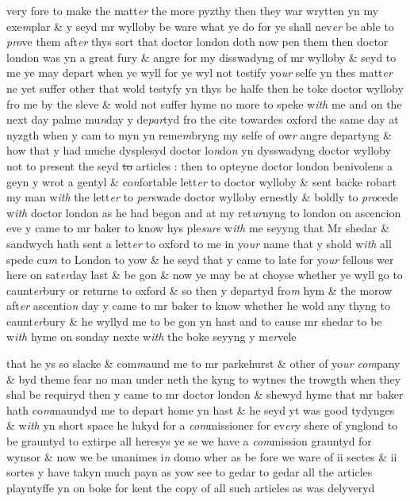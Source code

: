 \documentclass[12pt, a4paper]{book}
\begin{document}
 		
		\ifthenelse{\isodd{\thepage}}
		{\reversemarginpar}
		{\normalmarginpar}
		very fore to make the matt\textit{er} the more pyzthy then they war wrytten yn my exe\textit{m}plar \& y seyd mr wylloby be ware what ye do for ye shall nev\textit{er} be able to \textit{pro}ve them aft\textit{er }thys sort that doctor london doth now pen them then doctor london was yn a great fury \& angre for my disswadyng of mr wylloby \& seyd to me ye may depart when ye wyll for ye wyl not testify yo\textit{ur} selfe yn thes matt\textit{er} ne yet suffer other that wold testyfy yn thys be halfe then he toke doctor wylloby fro me by the sleve \& wold not suffer hyme no more to speke w\textit{ith} me and on the next day palme mu\textit{n}day y de\textit{par}tyd fro the cite towardes oxford the same day at nyzgth when y cam to myn yn reme\textit{m}bryng my selfe of ow\textit{r} angre departyng \& how that y had muche dysplesyd doctor lo\textit{n}do\textit{n} yn dysswadyng doctor wylloby not to p\textit{re}sent the seyd \sout{to }articles : then  to opteyne doctor london benivolens a geyn y wrot a gentyl \& co\textit{n}fortable lett\textit{er} to doctor wylloby \& sent backe robart my man w\textit{ith} the lett\textit{er} to \textit{per}swade doctor wylloby ernestly \& boldly to \textit{pro}cede w\textit{ith} doctor london as he had begon and at my ret\textit{ur}nyng to london on ascencion eve y came to mr baker to know hys ple\textit{sure} w\textit{ith} me seyyng that Mr shedar \& sandwych hath sent a lett\textit{er} to oxford to me in yo\textit{ur} name that y shold w\textit{ith} all spede cu\textit{m} to London to yow \& he seyd that y came to late for yo\textit{ur} fellous wer here on sat\textit{er}day last \& be gon \& now ye may be at choyse whether ye wyll go to caunt\textit{er}bury or returne to oxford \& so then y departyd fro\textit{m} hym \& the morow aft\textit{er} ascentio\textit{n} day y came to mr baker to know whether he wold any thyng to caunt\textit{er}bury \& he wyllyd me to be gon yn hast and to cause mr shedar to be w\textit{ith }hyme on sonday nexte w\textit{ith} the boke seyyng y m\textit{er}vele
 	
				\marginpar[\vspace{0.5cm}{\textcolor{Gray}{?knewe boke}}]{}
			
		\ifthenelse{\isodd{\thepage}}
		{\reversemarginpar}
		{\normalmarginpar}
		that he ys so slacke \& com\textit{m}aund me to mr parkehurst \& other of  yo\textit{ur com}pany \& byd theme fear no man under neth the kyng to wytnes the trowgth when they shal be requiryd then y came to mr doctor london \& shewyd hyme that mr baker hath co\textit{m}maundyd me to depart home yn hast \& he seyd yt was good tydynges \& w\textit{ith }yn short space he lukyd for a \textit{com}missioner for ev\textit{er}y shere of ynglond to be grauntyd to extirpe all heresys ye se we have a \textit{com}mission grauntyd for wynsor \& now we be unanimes i\textit{n} domo wher as be fore we ware of ii sectes \& ii sortes y have takyn much payn as yow see to gedar to gedar all the articles playntyffe yn on boke for kent the copy of all such articles as was delyveryd
 	
\end{document}
